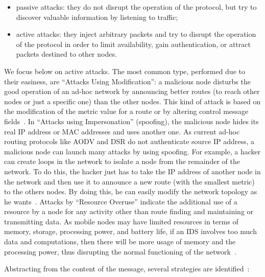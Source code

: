 \documentclass[compsoc, conference, letterpaper, 10pt, times]{IEEEtran}
\begin{document}
\begin{itemize}
\item  passive attacks: they do not disrupt the operation of the protocol, but try to discover valuable information by listening to traffic;
\item active attacks: they inject arbitrary packets and try to disrupt the operation of the protocol in order to limit availability,
gain authentication, or attract packets destined to other nodes.
\end{itemize}
We focus below on active attacks. The most common type, performed due to their easiness, are ``Attacks Using Modification'': a malicious node disturbs the good operation of an ad-hoc
network by announcing better routes (to reach other nodes or just a specific one) than the other nodes. This kind of attack is based on the modification of the metric value for a route or by
altering control message fields~\cite[p.956]{survey3}. In ``Attacks using Impersonation'' (spoofing), the malicious node hides its real IP address or MAC addresses and uses another one. As current ad-hoc routing protocols like AODV and DSR do not authenticate source IP address, a malicious node can launch many attacks by using spoofing. For example, a hacker can create loops in the network to isolate a node from the remainder of the network. To do this, the hacker just has to take the IP address of another node in the network and then use it to announce a new route (with the smallest metric) to the others nodes. By doing this, he can easily modify the
network topology as he wants~\cite[p.956]{survey3}. Attacks by ``Resource Overuse'' indicate the additional use of a resource by a node for any activity other than route finding and maintaining or
transmitting data. As mobile nodes may have limited resources in terms of memory, storage, processing power, and battery life, if an IDS involves too much data and computations, then there will be more usage of memory and the processing power, thus disrupting the normal functioning of the network~\cite[p.388]{survey9}.

Abstracting from the content of the message, several strategies are identified~\cite[p.345]{A}:
\end{document}
